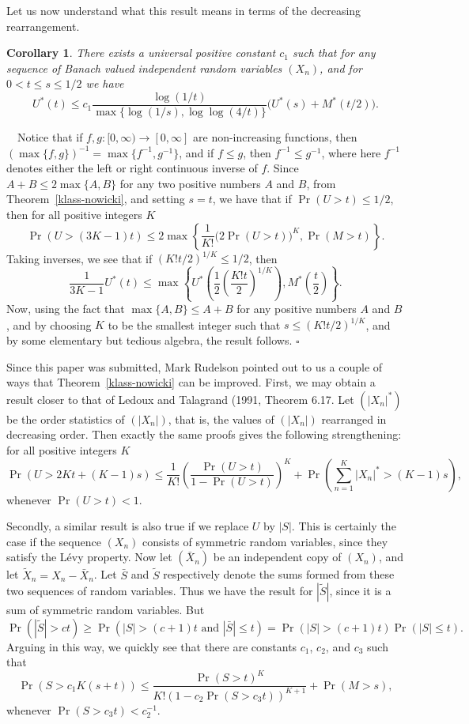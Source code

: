 \documentclass[12pt]{article}
\newtheorem{cor}[thm]{Corollary}
\newcommand{\modo}[1]{{\left|#1\right|}}
\newcommand{\Proof}{\medskip\noindent{\bf Proof:}\ \ }
\newcommand{\qed}{\leavevmode\unskip\penalty9999
                  \hbox{}\nobreak\hfill$\square$\goodbreak\medskip}
\begin{document}
Let us now understand what this result means in terms of the
decreasing rearrangement.

\begin{cor}
\label{klass-nowicki-decr}
There exists  a universal positive constant 
$c_1$ such that for any sequence of Banach valued independent random variables
$(X_n)$, and for $0<t\le s \le 1/2$ we 
have $$ U^*(t) \le c_1 {\frac{\log(1/t) }{
\max\{\log(1/s),\log\log(4/t)\}}} \bigl(U^*(s) + M^*(t/2)\bigr). $$
\end{cor}

\Proof  Notice that if $f,g:[0,\infty)\to[0,\infty]$ are 
non-increasing functions,
then $(\max\{f,g\})^{-1} = \max\{f^{-1},g^{-1}\}$, and if $f \le g$, 
then $f^{-1} \le g^{-1}$, where here $f^{-1}$ denotes either the left
or right continuous inverse of $f$. Since $A+B \le 2 \max\{A,B\}$ for
any 
two positive numbers $A$ and $B$, from Theorem~\ref{klass-nowicki}, 
and setting $s=t$, we have 
that if 
$\Pr(U>t) \le 1/2$, then for all positive integers $K$ 
$$ \Pr(U > (3 K - 1) t)\le 2 \max \left\{{\frac{1 }{ K!}} 
\bigl(2\Pr(U > t)\bigr)^K, \Pr(M > t) \right\} .$$ Taking inverses, we
see 
that if $(K!t/2)^{1/K} \le 1/2$, then $$ {\frac{1 }{3K-1}} U^*(t) \le
\max\left
\{ U^*\left({\frac12}\left({\frac{K!t }{ 2}}\right)^{1/K}\right) ,
M^*\left({\frac{t}{2}}
\right) \right\} .$$ 
Now, using the fact that $\max\{A,B\} \le A+B$
for any 
positive numbers $A$ and $B$, and by choosing $K$ to be the smallest
integer such that $s \le(K!t / 2)^{1/K}$, and by some elementary but
tedious algebra, the result follows. \qed

Since this paper was submitted, Mark Rudelson pointed out to us a
couple of ways that Theorem~\ref{klass-nowicki} can be improved.
First, we may obtain a result closer to that of
Ledoux and Talagrand (1991, Theorem 6.17.
Let $(\modo{X_n}^*)$ be the order statistics of $(\modo{X_n})$, that is,
the values of $(\modo{X_n})$ rearranged in decreasing order.  
Then exactly the same proofs gives the
following strengthening: for all positive integers $K$
$$ \Pr(U > 2K t + (K-1)s)
   \le {\frac{1 }{ K!}} \left(\frac{\Pr(U > t) }{ 1 -
   \Pr(U > t) }\right)^{K}+ 
   \Pr\left(\sum_{n=1}^K \modo{X_n}^* > (K-1)s\right) ,$$
whenever $\Pr(U>t) < 1$.

Secondly, a similar result is also true if we replace $U$ by $\modo S$.
This is certainly the case if the sequence $(X_n)$ consists of 
symmetric random variables, since they satisfy the L\'evy property.  
Now let $(\bar X_n)$ be an independent
copy of $(X_n)$, and let $\tilde X_n = X_n - \bar X_n$.  Let $\bar S$ and
$\tilde S$ respectively denote the sums formed from these two sequences of
random variables.  Thus we have the result for $\modo{\tilde S}$, since it is
a sum of symmetric random variables.  But
$$ \Pr(\modo{\tilde S} > c t)
   \ge \Pr(\modo S > (c+1)t \text{ and } \modo{\bar S}\le t)
   = \Pr(\modo S > (c+1)t) \Pr(\modo S \le t) .$$
Arguing in this way, we quickly see that there are constants $c_1$, $c_2$,
and $c_3$ such that
$$ \Pr(S > c_1 K(s+t))
   \le \frac{\Pr(S > t)^K }{ K!(1 -
   c_2 \Pr(S > c_3 t))^{K+1} }+ \Pr(M > s) ,$$
whenever $\Pr(S > c_3 t) < c_2^{-1}$.
\end{document}
